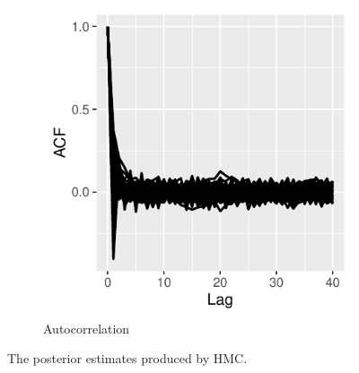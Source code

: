 \documentclass[10pt]{article}
\begin{document}
\begin{figure}[H]
\begin{subfigure}[b]{0.45\textwidth}
 \includegraphics[width=1\textwidth]{poisson_hmc_acf.pdf}
 \caption{Autocorrelation}
 \end{subfigure}  
 \caption{The posterior estimates produced by HMC.}
 \end{figure}
 


 
\end{document}
